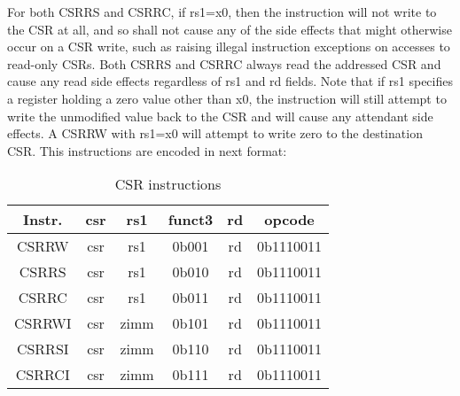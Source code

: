 \documentclass{scrreprt}
\begin{document}
For both CSRRS and CSRRC, if rs1=x0, then the instruction will not write to the CSR at all, and so shall not cause any of the side effects that might otherwise occur on a CSR write, such as raising illegal instruction exceptions on accesses to read-only CSRs. Both CSRRS and CSRRC always read the addressed CSR and cause any read side effects regardless of rs1 and rd fields. Note that if rs1 specifies a register holding a zero value other than x0, the instruction will still attempt to write the unmodified value back to the CSR and will cause any attendant side effects. A CSRRW with rs1=x0 will attempt to write zero to the destination CSR.
\hfill \break
\hfill \break
This instructions are encoded in next format:
\hfill \break
    \begin{table}[htb!]
        \centering
        \begin{tabular}{|c|c|c|c|c|c|} \hline 
             Instr. & csr & rs1 & funct3 & rd & opcode\\ \hline 
             CSRRW & csr & rs1 & 0b001 & rd & 0b1110011\\ \hline 
             CSRRS & csr  & rs1 & 0b010 & rd & 0b1110011\\ \hline 
             CSRRC & csr  & rs1 & 0b011 & rd & 0b1110011\\ \hline 
             CSRRWI & csr & zimm & 0b101 & rd & 0b1110011\\ \hline 
             CSRRSI & csr & zimm & 0b110 & rd & 0b1110011\\ \hline 
             CSRRCI & csr & zimm & 0b111 & rd & 0b1110011\\ \hline 
        \end{tabular}
        \caption{CSR instructions}
        \label{tab:CSRtable}
    \end{table}

\newpage
{} 
\end{document}
